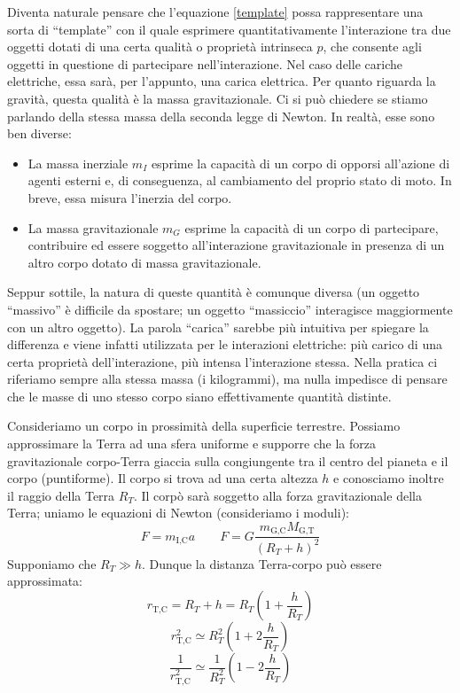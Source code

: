 \noindent Diventa naturale pensare che l'equazione \ref{template} possa rappresentare una
sorta di ``template'' con il quale esprimere quantitativamente l'interazione tra due
oggetti dotati di una certa qualità o proprietà intrinseca $p$, che consente agli oggetti in
questione di partecipare nell'interazione. Nel caso delle cariche elettriche,
essa sarà, per l'appunto, una carica elettrica. Per quanto riguarda la gravità,
questa qualità è la massa gravitazionale. Ci si può chiedere se stiamo parlando
della stessa massa della seconda legge di Newton. In realtà, esse sono ben diverse:
\begin{itemize}
    \item La massa inerziale $m_I$ esprime la capacità di un corpo di opporsi all'azione
    di agenti esterni e, di conseguenza, al cambiamento del proprio stato di moto.
    In breve, essa misura l'inerzia del corpo.

    \item La massa gravitazionale $m_G$ esprime la capacità di un corpo di partecipare,
    contribuire ed essere soggetto all'interazione gravitazionale in presenza di
    un altro corpo dotato di massa gravitazionale.
\end{itemize}
Seppur sottile, la natura di queste quantità è
comunque diversa (un oggetto ``massivo'' è difficile da spostare; un oggetto ``massiccio''
interagisce maggiormente con un altro oggetto). La parola ``carica'' sarebbe più intuitiva per spiegare la differenza
e viene infatti utilizzata per le interazioni elettriche: più carico di una certa
proprietà dell'interazione, più intensa l'interazione stessa. Nella pratica ci
riferiamo sempre alla stessa massa (i kilogrammi), ma nulla impedisce di pensare che le masse di
uno stesso corpo siano effettivamente quantità distinte.

Consideriamo un corpo in prossimità della superficie terrestre. Possiamo approssimare
la Terra ad una sfera uniforme e supporre che la forza gravitazionale corpo-Terra
giaccia sulla congiungente tra il centro del pianeta e il corpo (puntiforme). Il
corpo si trova ad una certa altezza $h$ e conosciamo inoltre il raggio della Terra
$R_T$. Il corpò sarà soggetto alla forza gravitazionale della Terra; uniamo le
equazioni di Newton (consideriamo i moduli):
\[ F = m_\text{I,C}a \qquad F = G\frac{m_\text{G,C}M_\text{G,T}}{(R_{T} + h)^2} \]
Supponiamo che $R_T \gg h$. Dunque la distanza Terra-corpo può essere approssimata:
\[ r_\text{T,C} = R_T + h = R_T\left(1 + \frac{h}{R_T}\right) \]
\[ r_\text{T,C}^2 \simeq R_T^2\left( 1 + 2\frac{h}{R_T} \right) \]
\[ \frac{1}{r_\text{T,C}^2} \simeq \frac{1}{R_T^2}\left( 1 - 2\frac{h}{R_T} \right) \]

